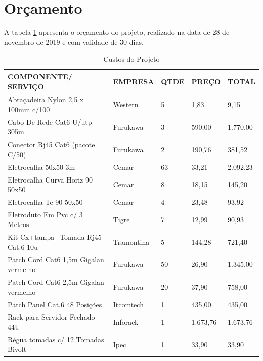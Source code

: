 \documentclass[	DIV=calc,%
paper=a4,%
fontsize=12pt,%
onecolumn]{scrartcl}	 					%
\begin{document}
	\section{Orçamento}
	A tabela \ref{tab3} apresenta o orçamento do projeto, realizado na data de 28 de novembro de 2019 e com validade de 30 dias.
	\begin{table}[h!]
		\footnotesize
		\centering
		\caption{Custos do Projeto}
		\label{tab3} %
		\renewcommand{\arraystretch}{1.5}
			\begin{tabular}{lllll}
				\toprule
				{\textbf{COMPONENTE/ SERVIÇO}}                   & {\textbf{EMPRESA}}        & {\textbf{QTDE}} & {\textbf{PREÇO}} & {\textbf{TOTAL}}   \\
				\midrule
				Abraçadeira Nylon 2,5 x 100mm c/100   & Western        & 5          & 1,83     & 9,15     \\
				Cabo De Rede Cat6 U/utp 305m          & Furukawa       & 3          & 590,00   & 1.770,00 \\
				Conector Rj45 Cat6 (pacote C/50)      & Furukawa       & 2          & 190,76   & 381,52   \\
				Eletrocalha 50x50 3m                  & Cemar          & 63         & 33,21    & 2.092,23 \\
				Eletrocalha Curva Horiz 90 50x50      & Cemar          & 8          & 18,15    & 145,20   \\
				Eletrocalha Te 90 50x50               & Cemar          & 4          & 23,48    & 93,92    \\
				Eletroduto Em Pvc c/ 3 Metros         & Tigre          & 7          & 12,99    & 90,93    \\
				Kit Cx+tampa+Tomada Rj45 Cat.6 10u    & Tramontina     & 5          & 144,28   & 721,40   \\
				Patch Cord Cat6 1,5m Gigalan vermelho & Furukawa       & 50         & 26,90    & 1.345,00 \\
				Patch Cord Cat6 2,5m Gigalan vermelho & Furukawa       & 20         & 37,90    & 758,00   \\
				Patch Panel Cat.6 48 Posições         & Itcomtech      & 1          & 435,00   & 435,00   \\
				Rack para Servidor Fechado 44U        & Inforack       & 1          & 1.673,76 & 1.673,76 \\
				Régua tomadas c/ 12 Tomadas Bivolt    & Ipec           & 1          & 33,90    & 33,90    \\

\end{tabular}
\end{table}
\end{document}
